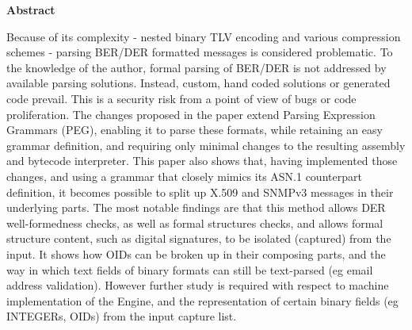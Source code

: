 \textbf{Abstract}

Because of its complexity - nested binary TLV encoding and various
compression schemes -
parsing BER/DER formatted messages is considered problematic. To the
knowledge of the author, formal parsing of BER/DER is not
addressed by available parsing solutions. Instead, custom, hand
coded solutions or generated code prevail. This is a security risk from a
point of view of bugs or code proliferation. The changes proposed in the
paper extend Parsing Expression Grammars
(PEG), enabling it to parse these formats, while retaining an
easy grammar definition, and requiring only minimal changes to the
resulting assembly and bytecode interpreter. This paper also shows that, having
implemented those changes, and using a grammar that closely mimics its
ASN.1 counterpart definition, it becomes possible to split up X.509 and SNMPv3
messages in their underlying parts. The most notable findings are that
this method allows DER well-formedness checks, as well as formal
structures checks, and allows formal structure content, such as digital
signatures, to be isolated (captured) from the input. It shows how OIDs
can be broken up in their composing parts, and the way in which text
fields of binary formats can still be text-parsed (eg email address
validation). However further study is required with respect to machine
implementation of the Engine, and the representation of certain binary
fields (eg INTEGERs, OIDs) from the input capture list.

